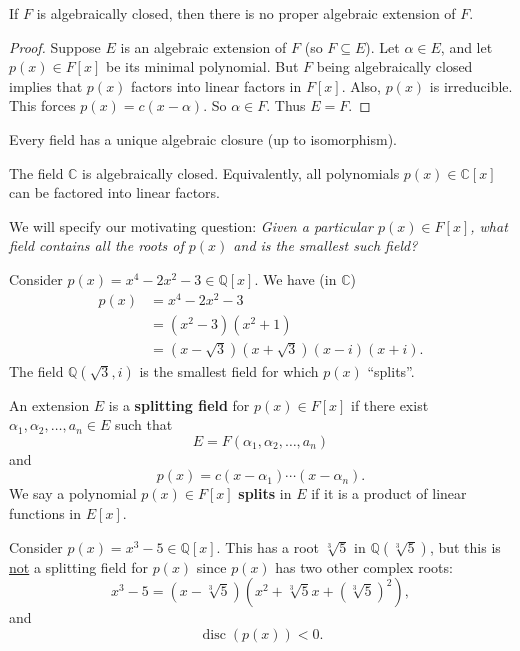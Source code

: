 \begin{corollary}
	If $F$ is algebraically closed, then there is no proper algebraic extension of $F$.
\end{corollary}

\begin{proof}
	Suppose $E$ is an algebraic extension of $F$ (so $F\subseteq E$). Let $\alpha\in E$, and let $p(x)\in F[x]$ be its minimal polynomial. But $F$ being algebraically closed implies that $p(x)$ factors into linear factors in $F[x]$. Also, $p(x)$ is irreducible. This forces $p(x)=c(x-\alpha)$. So $\alpha\in F$. Thus $E=F$.
\end{proof}

\begin{theorem}
	Every field has a unique algebraic closure (up to isomorphism).
\end{theorem}

\begin{theorem}
	The field $\mathbb C$ is algebraically closed. Equivalently, all polynomials $p(x)\in\mathbb C[x]$ can be factored into linear factors.
\end{theorem}

We will specify our motivating question: \textit{Given a particular $p(x)\in F[x]$, what field contains all the roots of $p(x)$ and is the smallest such field?}

\begin{example}
	Consider $p(x)=x^4-2x^2-3\in\mathbb Q[x]$. We have (in $\mathbb C$)
	\begin{align*}
		p(x)&=x^4-2x^2-3\\
		&=(x^2-3)(x^2+1)\\
		&=(x-\sqrt 3)(x+\sqrt 3)(x-i)(x+i).
	\end{align*}
	The field $\mathbb Q(\sqrt 3,i)$ is the smallest field for which $p(x)$ ``splits''.
\end{example}

\begin{definition}
	An extension $E$ is a \textbf{splitting field} for $p(x)\in F[x]$ if there exist $\alpha_1,\alpha_2,\hdots,a_n\in E$ such that
	$$E=F(\alpha_1,\alpha_2,\hdots,a_n)$$
	and
	$$p(x)=c(x-\alpha_1)\cdots(x-\alpha_n).$$
	We say a polynomial $p(x)\in F[x]$ \textbf{splits} in $E$ if it is a product of linear functions in $E[x]$.
\end{definition}

\begin{example}
	Consider $p(x)=x^3-5\in\mathbb Q[x]$. This has a root $\sqrt[3]{5}$ in $\mathbb Q(\sqrt[3]{5})$, but this is \underline{not} a splitting field for $p(x)$ since $p(x)$ has two other complex roots:
	$$x^3-5=(x-\sqrt[3]{5})(x^2+\sqrt[3]{5}x+(\sqrt[3]{5})^2),$$
	and
	$$\operatorname{disc}(p(x))<0.$$
\end{example}

